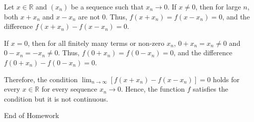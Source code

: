 \documentclass [10pt]{article}
\begin{document}
\begin{enumerate}
{Let $x \in \mathbb{R}$ and $(x_n)$ be a sequence such that $x_n \to 0$. If $x \neq 0$, then for large $n$, both $x + x_n$ and $x-x_n$ are not $0$. Thus, $f(x+x_n) = f(x-x_n) = 0$, and the difference $f(x+x_n) - f(x-x_n) = 0$. 

If $x = 0$, then for all finitely many terms or non-zero $x_n$, $0+x_n = x_n \neq 0$ and $0-x_n = -x_n \neq 0$. Thus, $f(0+x_n) = f(0-x_n) = 0$, and the difference $f(0+x_n) - f(0-x_n) = 0$.

Therefore, the condition $\lim_{n \to \infty}[f(x+x_n)-f(x-x_n)]=0$ holds for every $x \in \mathbb{R}$ for every sequence $x_n \to 0$. Hence, the function $f$ satisfies the condition but it is not continuous.
}
\end{enumerate}

\clearpage
\begin{center}
\vspace*{\fill}
{\Large End of Homework}
\vspace*{\fill}
\end{center}
\end{document}
